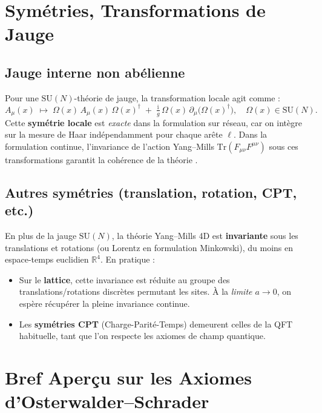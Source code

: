 \section{Symétries, Transformations de Jauge}
\label{sec:3.4}

\subsection*{Jauge interne non abélienne}
Pour une \(\mathrm{SU}(N)\)-théorie de jauge, la transformation locale agit comme :
\[
A_\mu(x) \;\mapsto\; \Omega(x)\,A_\mu(x)\,\Omega(x)^\dagger \;+\; \tfrac{\mathrm{i}}{g}\,\Omega(x)\,\partial_\mu\!\bigl(\Omega(x)^\dagger\bigr),
\quad
\Omega(x)\in \mathrm{SU}(N).
\]
Cette \textbf{symétrie locale} est \emph{exacte} dans la formulation sur réseau, car on intègre sur la mesure de Haar indépendamment pour chaque arête \(\ell\). Dans la formulation continue, l’invariance de l’action Yang--Mills \(\mathrm{Tr}(F_{\mu\nu}F^{\mu\nu})\) sous ces transformations garantit la cohérence de la théorie \cite{ItzyksonDrouffe1989,Nakahara2003}.

\subsection*{Autres symétries (translation, rotation, CPT, etc.)}
En plus de la jauge \(\mathrm{SU}(N)\), la théorie Yang--Mills 4D est \textbf{invariante} sous les translations et rotations (ou Lorentz en formulation Minkowski), du moins en espace-temps euclidien \(\mathbb{R}^4\). En pratique :
\begin{itemize}
	\item Sur le \textbf{lattice}, cette invariance est réduite au groupe des translations/rotations discrètes permutant les sites. À la \emph{limite \(a\to 0\)}, on espère récupérer la pleine invariance continue.
	\item Les \textbf{symétries CPT} (Charge-Parité-Temps) demeurent celles de la QFT habituelle, tant que l’on respecte les axiomes de champ quantique.
\end{itemize}

	\section{Bref Aperçu sur les Axiomes d’Osterwalder--Schrader}
	\label{sec:3.5}
	
